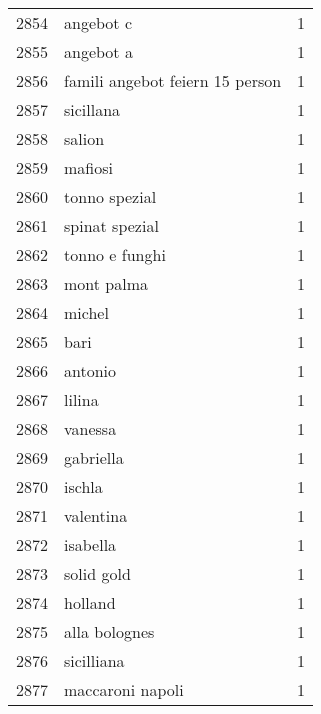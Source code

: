 \begin{tabular}{llr}
2854 &                                          angebot c &      1 \\
2855 &                                          angebot a &      1 \\
2856 &                    famili angebot feiern 15 person &      1 \\
2857 &                                          sicillana &      1 \\
2858 &                                             salion &      1 \\
2859 &                                            mafiosi &      1 \\
2860 &                                      tonno spezial &      1 \\
2861 &                                     spinat spezial &      1 \\
2862 &                                     tonno e funghi &      1 \\
2863 &                                         mont palma &      1 \\
2864 &                                             michel &      1 \\
2865 &                                               bari &      1 \\
2866 &                                            antonio &      1 \\
2867 &                                             lilina &      1 \\
2868 &                                            vanessa &      1 \\
2869 &                                          gabriella &      1 \\
2870 &                                             ischla &      1 \\
2871 &                                          valentina &      1 \\
2872 &                                           isabella &      1 \\
2873 &                                         solid gold &      1 \\
2874 &                                            holland &      1 \\
2875 &                                      alla bolognes &      1 \\
2876 &                                         sicilliana &      1 \\
2877 &                                   maccaroni napoli &      1 \\

\end{tabular}
